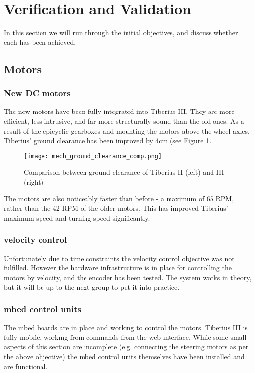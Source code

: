 \section{Verification and Validation}
In this section we will run through the initial objectives, and discuss whether each has been achieved.
\subsection{Motors}
\subsubsection{New DC motors}
The new motors have been fully integrated into Tiberius III. They are more efficient, less intrusive, and far more structurally sound than the old ones. As a result of the epicyclic gearboxes and mounting the motors above the wheel axles, Tiberius' ground clearance has been improved by 4cm (see Figure \ref{fig:mech_gc}.
\begin{figure}[!htb]
\begin{center}
\texttt{[image: mech\_ground\_clearance\_comp.png]}
\end{center}
\caption{Comparison between ground clearance of Tiberius II (left) and III (right)}
\label{fig:mech_gc}
\end{figure}
\newline
The motors are also noticeably faster than before - a maximum of 65 RPM, rather than the 42 RPM of the older motors. This has improved Tiberius' maximum speed and turning speed significantly.

\subsubsection{velocity control}
Unfortunately due to time constraints the velocity control objective was not fulfilled. However the hardware infrastructure is in place for controlling the motors by velocity, and the encoder has been tested. The system works in theory, but it will be up to the next group to put it into practice.

\subsubsection{mbed control units}
The mbed boards are in place and working to control the motors. Tiberius III is fully mobile, working from commands from the web interface. While some small aspects of this section are incomplete (e.g. connecting the steering motors as per the above objective) the mbed control units themselves have been installed and are functional.

